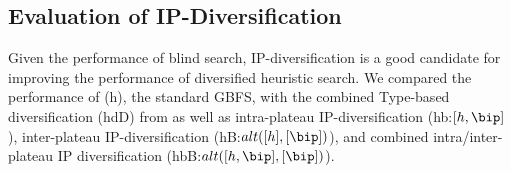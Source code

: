 \subsection{Evaluation of IP-Diversification} 



Given the performance of blind search,
IP-diversification is a good candidate for improving the performance of diversified heuristic search.
% 
% 
% 
We compared the performance of 
(h), the standard GBFS, with
the combined Type-based diversification (hdD) from 
as well as intra-plateau  IP-diversification (hb:$[h,\bip]$), inter-plateau IP-diversification (hB:$alt([h],[\bip])$), and combined intra/inter-plateau IP diversification (hbB:$alt([h,\bip],[\bip])$).

